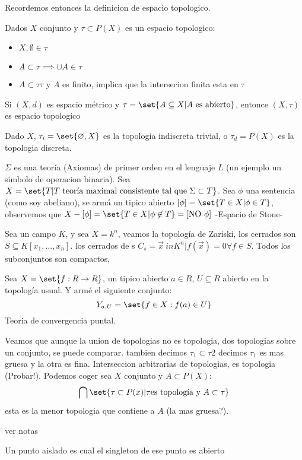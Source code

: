 Recordemos entonces la definicion de espacio topologico.
\begin{define}
Dados $X$ conjunto y $ \tau \subset P(X) $ es un espacio topologico:
\begin{itemize}
	\item $X, \emptyset \in  \tau$
	\item $A \subset \tau \implies \cup A \in \tau $
	\item $ A \subset \tau \tau$ y $A$ es finito, implica que la intersecion finita esta en $ \tau $
\end{itemize}
\end{define}

\begin{exm}
	Si $ (X,d) $ es espacio métrico y $ \tau = \set{A \subseteq X | A \textrm{ es abierto}}$, entonce $ (X, \tau) $ es espacio topologico
\end{exm}
\begin{exm}
	Dado $X$, $ \tau_i = \set{\varnothing, X} $ es la topologia indiscreta trivial, o $ \tau_d = P(X) $ es la topologia discreta.
\end{exm}
\begin{exm}
	$ \Sigma $ es una teoría (Axiomas) de primer orden en el lenguaje $L$ (un ejemplo un simbolo de operacion binaria). Sea $X = \set{T | T \textrm{ teoría maximal consistente tal que } \Sigma \subset T} $. Sea $ \phi $ una sentencia (como soy abeliano), se armá un tipico abierto $ [ \phi ] = \set{T \in X | \phi \in T} $, observemos que $ X - [\phi] = \set{T \in X | \phi \not \in T} = [\textrm{NO } \phi]$ -Espacio de Stone-
\end{exm}
\begin{exm}
	Sea un campo $K$, y sea $X = k^n $, veamos la topología de Zariski, los cerrados son $ S \subseteq K[x_1, ..., x_n] $. los cerrados de s $ C_s = {\vec{x} \ in K^n | f(\vec{x})= 0 \forall f \in S} $. Todos los subconjuntos son compactos, 
\end{exm}
\begin{exm}
	Sea $X = \set{f: R \rightarrow R}$, un tipico abierto $ a \in R $, $ U \subseteq R$ abierto en la topología usual. Y armé el siguiente conjunto:
	\[ Y_{a,U} = \set{f \in X : f(a) \in U} \] Teoria de convergencia puntal.
\end{exm}
Veamos que aunque la union de topologias no es topologia,  dos topologias sobre un conjunto, se puede comparar.
tambien decimos $ \tau_1 \subset \tau 2$ decimos $\tau_1$ es mas gruesa y la otra es fina. Interseccion arbitrarias de topologias, es topologia (Probar!).
Podemos coger sea $X$ conjunto y $A \subset P(X) $:
\[ \bigcap\set{\tau \subset P(x) | \tau \textrm{es topología y } A \subset \tau} \] 
esta es la menor topologia que contiene a $A$ (la mas gruesa?). 
\begin{exm}
	ver notas
\end{exm}
\begin{define}
	Un punto aislado es cual el singleton de ese punto es abierto
\end{define}
